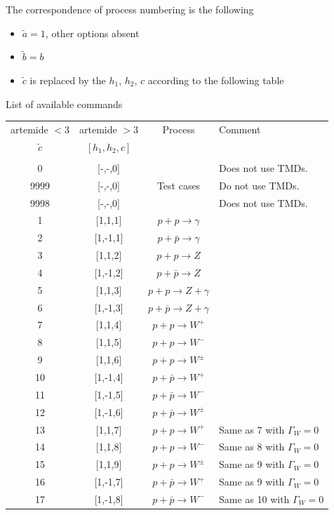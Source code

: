 \documentclass[prd,nofootinbib,eqsecnum,final]{revtex4}
\renewcommand{\(}{\left(}
\renewcommand{\)}{\right)}
\renewcommand{\[}{\left[}
\renewcommand{\]}{\right]}
\begin{document}
The correspondence of process numbering is the following
\begin{itemize}
\item $\tilde a=1$, other options absent
\item $\tilde b=b$
\item $\tilde c$ is replaced by the $h_1$, $h_2$, $c$ according to the following table
\end{itemize}
\begin{center}
List of available commands
\\
\begin{longtable}{||c|c||c|p{8cm}||}
\hline\hline
artemide $<3$ & artemide $>3$ & Process & Comment
\\ $\tilde c$ & $[h_1,h_2,c]$ & & \\
\\\hline
0 & [-,-,0] &  & Does not use TMDs.
\\
9999 & [-,-,0] & Test cases & Do not use TMDs.
\\
9998 & [-,-,0] &  & Does not use TMDs.
\\\hline
1 & [1,1,1] & $p+p\to \gamma$ &
\\\hline
2 & [1,-1,1] & $p+\bar p\to \gamma$ &
\\\hline
3 & [1,1,2] & $p+p\to Z$ &
\\\hline
4 & [1,-1,2] & $p+\bar p\to Z$ &
\\\hline
5 & [1,1,3] & $p+p\to Z+\gamma$ &
\\\hline
6 & [1,-1,3] & $p+\bar p\to Z+\gamma$ &
\\\hline
7 & [1,1,4] & $p+p\to W^+$ &
\\\hline
8 & [1,1,5] & $p+p\to W^-$ &
\\\hline
9 & [1,1,6] & $p+p\to W^\pm$ &
\\\hline
10 & [1,-1,4] & $p+\bar p\to W^+$ &
\\\hline
11 & [1,-1,5] & $p+\bar p\to W^-$ &
\\\hline
12 & [1,-1,6] & $p+\bar p\to W^\pm$ &
\\\hline
13 & [1,1,7] & $p+p\to W^+$ & Same as 7 with $\Gamma_W=0$
\\\hline
14 & [1,1,8] & $p+p\to W^-$ & Same as 8 with $\Gamma_W=0$
\\\hline
15 & [1,1,9] & $p+p\to W^\pm$ & Same as 9 with $\Gamma_W=0$
\\\hline
16 & [1,-1,7] & $p+\bar p\to W^+$ & Same as 9 with $\Gamma_W=0$
\\\hline
17 & [1,-1,8] & $p+\bar p\to W^-$ & Same as 10 with $\Gamma_W=0$

\end{longtable}
\end{center}
\end{document}
